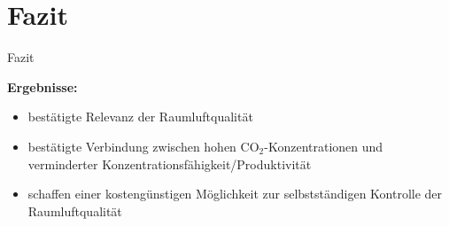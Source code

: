 \documentclass[10pt,ngerman]{beamer}
\begin{document}
\section{Fazit}
\begin{frame}[fragile]{Fazit}
  \begin{minipage}[t]{0.80\textwidth}
    \textbf{Ergebnisse:}\newline
    \begin{itemize}
      \item bestätigte Relevanz der Raumluftqualität
      \item bestätigte Verbindung zwischen hohen CO$_2$-Konzentrationen und verminderter Konzentrationsfähigkeit/Produktivität
      \item schaffen einer kostengünstigen Möglichkeit zur selbstständigen Kontrolle der Raumluftqualität
    \end{itemize}
  \end{minipage}
\end{frame}




\end{document}

